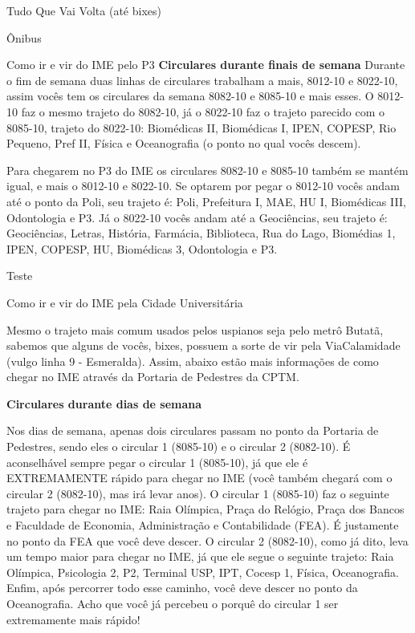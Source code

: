 \begin{secao}{Tudo Que Vai Volta (até bixes)}
\begin{subsecao}{Ônibus}
\begin{subsubsecao}{Como ir e vir do IME pelo P3}
{\bf Circulares durante finais de semana}
Durante o fim de semana duas linhas de circulares trabalham a mais, 8012-10 e 8022-10,
assim vocês tem os circulares da semana 8082-10 e 8085-10 e mais esses.
O 8012-10 faz o mesmo trajeto do 8082-10, já o 8022-10 faz o trajeto parecido com
o 8085-10, trajeto do 8022-10: Biomédicas II, Biomédicas I, IPEN, COPESP, Rio 
Pequeno, Pref II, Física e Oceanografia (o ponto no qual vocês descem).

Para chegarem no P3 do IME os circulares 8082-10 e 8085-10 também se mantém igual, 
e mais o 8012-10 e 8022-10. Se optarem por pegar o 8012-10 vocês andam até o ponto da Poli, 
seu trajeto é: Poli, Prefeitura I, MAE, HU I, Biomédicas III, Odontologia e P3. Já o 8022-10 
vocês andam até a Geociências, seu trajeto é: Geociências, Letras, História, Farmácia, 
Biblioteca, Rua do Lago, Biomédias 1, IPEN, COPESP, HU, Biomédicas 3, Odontologia e P3.

Teste

\end{subsubsecao}

\begin{subsubsecao}{Como ir e vir do IME pela Cidade Universitária}

Mesmo o trajeto mais comum usados pelos uspianos seja pelo metrô Butatã, sabemos 
que alguns de vocês, bixes, possuem a sorte de vir pela ViaCalamidade 
(vulgo linha 9 - Esmeralda). 
Assim, abaixo estão mais informações de como chegar no IME através da Portaria de 
Pedestres da CPTM.

{\bf Circulares durante dias de semana}

Nos dias de semana, apenas dois circulares passam no ponto da Portaria de Pedestres,
sendo eles o circular 1 (8085-10) e o circular 2 (8082-10). É aconselhável sempre 
pegar o circular 1 (8085-10), já que ele é EXTREMAMENTE rápido para chegar no IME 
(você também chegará com o circular 2 (8082-10), mas irá levar anos).
O circular 1 (8085-10) faz o seguinte trajeto para chegar no IME: Raia Olímpica, 
Praça do Relógio, Praça dos Bancos e Faculdade de Economia, Administração e Contabilidade
(FEA). É justamente no ponto da FEA que você deve descer.
O circular 2 (8082-10), como já dito, leva um tempo maior para chegar no IME, já
que ele segue o seguinte trajeto: Raia Olímpica, Psicologia 2, P2, Terminal USP, IPT,
Cocesp 1, Física, Oceanografia. Enfim, após percorrer todo esse caminho, você deve 
descer no ponto da Oceanografia. Acho que você já percebeu o porquê do circular 1
ser extremamente mais rápido!


\end{subsubsecao}
\end{subsecao}
\end{secao}
